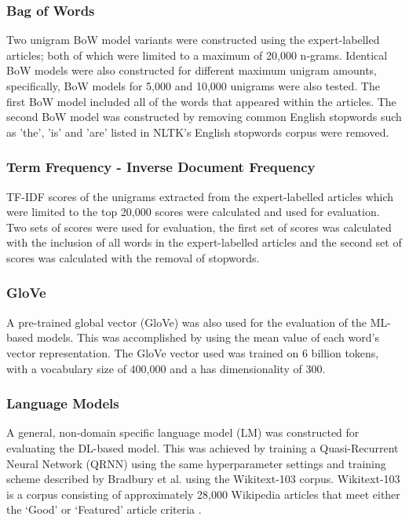 \documentclass[a4paper,twoside,phd]{BYUPhys}
\begin{document}
\subsubsection{Bag of Words}
\label{sec:FeatureSelectionBoW}
Two unigram BoW model variants were constructed using the expert-labelled articles; both of which were limited to a maximum of 20,000 n-grams. Identical BoW models were also constructed for different maximum unigram amounts, specifically, BoW models for 5,000 and 10,000 unigrams were also tested. The first BoW model included all of the words that appeared within the articles. The second BoW model was constructed by removing common English stopwords such as 'the', 'is' and 'are' listed in NLTK's English stopwords corpus \cite{Bird2009} were removed.

\subsubsection{Term Frequency - Inverse Document Frequency}
\label{sec:FeatureSelectionTFIDF}
TF-IDF scores of the unigrams extracted from the expert-labelled articles which were limited to the top 20,000 scores were calculated and used for evaluation. Two sets of scores were used for evaluation, the first set of scores was calculated with the inclusion of all words in the expert-labelled articles and the second set of scores was calculated with the removal of stopwords.

\subsubsection{GloVe}
\label{sec:FeatureSelectionGloVe}

A pre-trained global vector (GloVe) \cite{pennington2014glove} was also used for the evaluation of the ML-based models. This was accomplished by using the mean value of each word's vector representation. The GloVe vector used was trained on 6 billion tokens, with a vocabulary size of 400,000 and a has dimensionality of 300.

\subsubsection{Language Models}
\label{sec:FeatureSelectionLM}

A general, non-domain specific language model (LM) was constructed for evaluating the DL-based model. This was achieved by training a Quasi-Recurrent Neural Network (QRNN) using the same hyperparameter settings and training scheme described by Bradbury et al. \cite{bradbury2016quasi} using the Wikitext-103 corpus. Wikitext-103 is a corpus consisting of approximately 28,000 Wikipedia articles that meet either the `Good' or `Featured' article criteria \cite{Merity2016}. \newline
\end{document}
